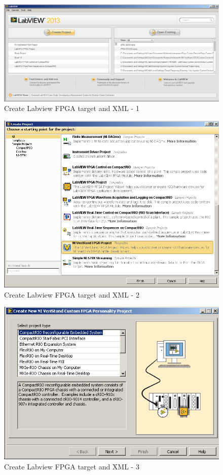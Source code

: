 \documentclass[a4paper,english]{report}
\begin{document}
\begin{figure}[htb!]
	\centering \includegraphics[scale=0.45]{Screenshots/Screenshot_2015-01-16_19-21-16.png}
	\caption{Create Labview FPGA target and XML - 1}
	\label{fig: Create Labview FPGA target and XML-1} 
\end{figure}
\begin{figure}[htb!]
	\centering \includegraphics[scale=0.45]{Screenshots/Screenshot_2015-01-16_19-23-23.png}
	\caption{Create Labview FPGA target and XML - 2}
	\label{fig: Create Labview FPGA target and XML-2} 
\end{figure}
\begin{figure}[htb!]
	\centering \includegraphics[scale=0.45]{Screenshots/Screenshot_2015-01-16_19-23-41.png}
	\caption{Create Labview FPGA target and XML - 3}
	\label{fig: Create Labview FPGA target and XML-3} 
\end{figure}
\end{document}

